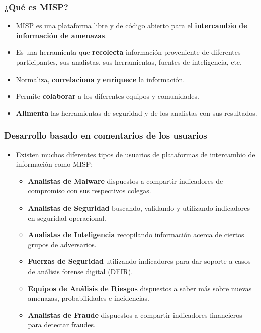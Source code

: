 \begin{frame}
\frametitle{¿Qué es MISP?}
\begin{itemize}
       \item MISP es una plataforma libre y de código abierto para el {\bf intercambio de información de amenazas}.
       \item Es una herramienta que {\bf recolecta} información proveniente de diferentes participantes, sus analistas, sus herramientas, fuentes de inteligencia, etc.
       \item Normaliza, {\bf correlaciona} y {\bf enriquece} la información.
       \item Permite {\bf colaborar} a los diferentes equipos y comunidades.
       \item {\bf Alimenta} las herramientas de seguridad y de los analistas con sus resultados.
\end{itemize}
\end{frame}

\begin{frame}
\frametitle{Desarrollo basado en comentarios de los usuarios}
\begin{itemize}
\item Existen muchos diferentes tipos de usuarios de plataformas de intercambio de información como MISP:
        \begin{itemize}
                \item {\bf Analistas de Malware} dispuestos a compartir indicadores de compromiso con sus respectivos colegas.
                \item {\bf Analistas de Seguridad} buscando, validando y utilizando indicadores en seguridad operacional.
                \item {\bf Analistas de Inteligencia} recopilando información acerca de ciertos grupos de adversarios.
                \item {\bf Fuerzas de Seguridad} utilizando indicadores para dar soporte a casos de análisis forense digital (DFIR).
                \item {\bf Equipos de Análisis de Riesgos} dispuestos a saber más sobre nuevas amenazas, probabilidades e incidencias.
                \item {\bf Analistas de Fraude} dispuestos a compartir indicadores financieros para detectar fraudes.
        \end{itemize}
\end{itemize}
\end{frame}

